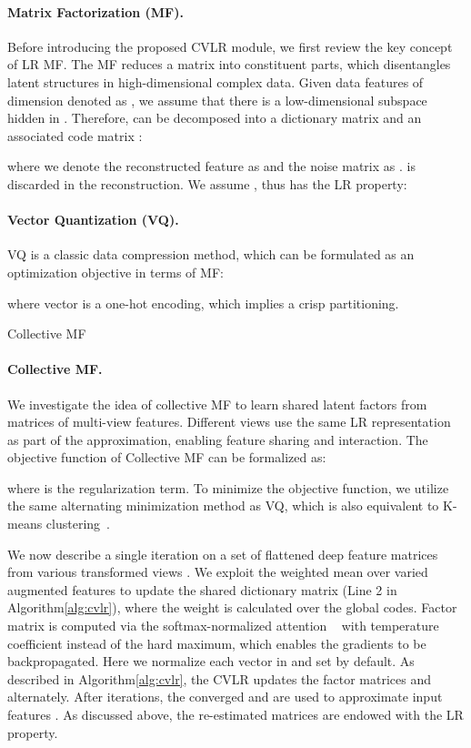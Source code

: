 \documentclass[twocolumn]{svjour3}          \smartqed  \usepackage{graphicx}
\makeatletter
\newcommand{\Alg}{Algorithm\@\xspace}
\makeatother
\begin{document}
\paragraph{Matrix Factorization (MF).}
Before introducing the proposed CVLR module, we first review the key concept of LR MF.
The MF reduces a matrix into constituent parts, which disentangles latent structures in high-dimensional complex data.
Given  data features of dimension  denoted as , we assume that there is a low-dimensional subspace hidden in . Therefore,  can be decomposed into a dictionary matrix   and an associated code matrix :

where we denote the reconstructed feature as  and the noise matrix as .  is discarded in the reconstruction.
We assume , thus  has the LR property:


\paragraph{Vector Quantization (VQ).}
VQ is a classic data compression method, which can be formulated as an optimization objective in terms of MF:

where vector  is a one-hot encoding, which implies a crisp partitioning.

\begin{algorithm}[t!]
\SetAlgoLined
\KwIn{
  ,
  ,
  
}
 \;
\KwOut{ }
 \caption{Collective MF}
 \label{alg:cvlr}
\end{algorithm}

\paragraph{Collective MF.}
We investigate the idea of collective MF to learn shared latent factors from  matrices of multi-view features.
Different views use the same LR representation as part of the approximation, enabling feature sharing and interaction.
The objective function of Collective MF can be formalized as:

where  is the regularization term.
To minimize the objective function, we utilize the same alternating minimization method as VQ, which is also equivalent to K-means clustering~\citep{gray1998:quantization}.

We now describe a single iteration on a set of flattened deep feature matrices from various transformed views .
We exploit the weighted mean over varied augmented features to update the shared dictionary matrix  (Line 2 in \Alg\ref{alg:cvlr}), where the weight  is calculated over the global codes.
Factor matrix  is computed via the softmax-normalized attention ~\citep{VaswaniSPUJGKP17:transformer} with temperature coefficient  instead of the hard maximum, which enables the gradients to be backpropagated. 
Here we normalize each vector in  and set  by default.
As described in \Alg\ref{alg:cvlr}, the CVLR updates the factor matrices  and  alternately. After  iterations, the converged  and  are used to approximate input features .
As discussed above, the re-estimated matrices  are endowed with the LR property.
\end{document}
